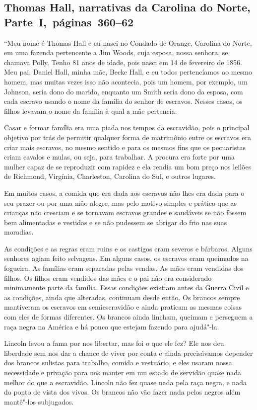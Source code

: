 \subsection{Thomas Hall, narrativas da Carolina do Norte, Parte~I,~páginas~360--62}
\label{ref118}

``Meu nome é Thomas Hall e eu nasci no Condado de Orange, Carolina do
Norte, em uma fazenda pertencente a Jim Woods, cuja esposa, nossa
senhora, se chamava Polly. Tenho 81 anos de idade, pois nasci em 14 de
fevereiro de 1856. Meu pai, Daniel Hall, minha mãe, Becke Hall, e eu
todos pertencíamos ao mesmo homem, mas muitas vezes isso não acontecia,
pois um homem, por exemplo, um Johnson, seria dono do marido, enquanto
um Smith seria dono da esposa, com cada escravo usando o nome da família
do senhor de escravos. Nesses casos, os filhos levavam o nome da família
à qual a mãe pertencia.

Casar e formar família era uma piada nos tempos da escravidão, pois o
principal objetivo por trás de permitir qualquer forma de matrimônio
entre os escravos era criar mais escravos, no mesmo sentido e para os
mesmos fins que os pecuaristas criam cavalos e mulas, ou seja, para
trabalhar. A procura era forte por uma mulher capaz de se reproduzir com
rapidez e ela rendia um bom preço nos leilões de Richmond, Virgínia,
Charleston, Carolina do Sul, e outros lugares.

Em muitos casos, a comida que era dada aos escravos não lhes era dada
para o seu prazer ou por uma mão alegre, mas pelo motivo simples e
prático que as crianças não cresciam e se tornavam escravos grandes e
saudáveis se não fossem bem alimentadas e vestidas e se não pudessem se
abrigar do frio nas suas moradias.

As condições e as regras eram ruins e os castigos eram severos e
bárbaros. Alguns senhores agiam feito selvagens. Em alguns casos, os
escravos eram queimados na fogueira. As famílias eram separadas pelas
vendas. As mães eram vendidas dos filhos. Os filhos eram vendidos das
mães e o pai não era considerado minimamente parte da família. Essas
condições existiam antes da Guerra Civil e as condições, ainda que
alteradas, continuam desde então. Os brancos sempre mantiveram os
escravos em semiescravidão e ainda praticam as mesmas coisas com eles de
formas diferentes. Os brancos ainda lincham, queimam e perseguem a raça
negra na América e há pouco que estejam fazendo para ajudá"-la.

Lincoln levou a fama por nos libertar, mas foi o que ele fez? Ele nos
deu liberdade sem nos dar a chance de viver por conta e ainda
precisávamos depender dos brancos sulistas para trabalho, comida e
vestuário, e eles usaram nossa necessidade e privação para nos manter em
um estado de servidão quase nada melhor do que a escravidão. Lincoln não
fez quase nada pela raça negra, e nada do ponto de vista dos vivos. Os
brancos não vão fazer nada pelos negros além mantê"-los subjugados.


